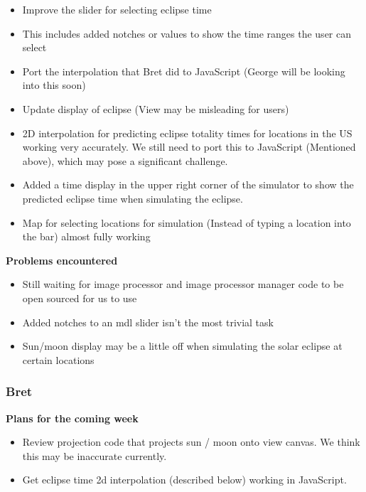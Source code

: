 \documentclass[10pt, onecolumn, draftclsnofoot, letterpaper, compsoc]{IEEEtran}
\begin{document}
    \begin{itemize}

    \item Improve the slider for selecting eclipse time
       \item This includes added notches or values to show the time ranges the user can select
    \item Port the interpolation that Bret did to JavaScript (George will be looking into this soon)
    \item Update display of eclipse (View may be misleading for users)

    \item 2D interpolation for predicting eclipse totality times for locations in the
    US working very accurately. We still need to port this to JavaScript (Mentioned above), which may pose a significant challenge.
    \item Added a time display in the upper right corner of the simulator to show the predicted eclipse time when simulating the eclipse.
    \item Map for selecting locations for simulation (Instead of typing a location into the bar) almost fully working

    \end{itemize}

    \noindent \textbf{Problems encountered}

    \begin{itemize}

    \item Still waiting for image processor and image processor manager code to be open sourced for us to use
    \item Added notches to an mdl slider isn't the most trivial task
    \item Sun/moon display may be a little off when simulating the solar eclipse at certain locations

    \end{itemize}

    \subsubsection{Bret}

    \noindent \textbf{Plans for the coming week}

    \begin{itemize}

    \item Review projection code that projects sun / moon onto view canvas. We think this may be inaccurate currently.
    \item Get eclipse time 2d interpolation (described below) working in JavaScript.

    \end{itemize}
\end{document}

